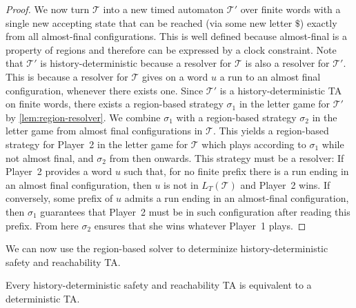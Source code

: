 \documentclass[10pt,a4paper]{amsart}
\theoremstyle{definition}
\numberwithin{equation}{section}
\newcommand{\T}{\mathcal{T}}
\newcommand{\strat}{\sigma}
\newcommand{\lang}{L_T}  %
\begin{document}
\begin{proof}
We now turn $\T$ into a new timed automaton $\T'$ over finite words
with a single new accepting state that can be reached (via some new letter $\$$)
exactly from all almost-final configurations.
This is well defined because almost-final is a property of regions and therefore can be expressed by a clock constraint.
Note that $\T'$ is history-deterministic because a resolver for $\T$ is also a resolver for $\T'$. This is because a resolver for $\T$ gives on a word $u$ a run to an almost final configuration, whenever there exists one.
Since $\T'$ is a history-deterministic TA on finite words, there exists a region-based strategy $\strat_1$ in the letter game for $\T'$  by \cref{lem:region-resolver}. 
We combine $\sigma_1$ with a region-based strategy $\strat_2$ in the letter game from almost final configurations in $\T$.
This yields a region-based strategy for Player~2 in the letter game for $\T$ which plays according to $\strat_1$
while not almost final, and $\sigma_2$ from then onwards.
This strategy must be a resolver:
If Player~2 provides a word $u$ such that, for no finite prefix there is a run ending in an almost final configuration,
then $u$ is not in $\lang(\T)$ and Player~2 wins.
If conversely, some prefix of $u$ admits a run ending in an almost-final configuration,
then $\sigma_1$ guarantees that Player~2 must be in such configuration after reading this prefix.
From here $\strat_2$ ensures that she wins whatever Player~1 plays.
\end{proof}


We can now use the region-based solver to determinize history-deterministic safety and reachability TA.

\begin{theorem}
\label{thm:safety-determinisable}
Every history-deterministic safety and reachability TA is equivalent to a deterministic TA.
\end{theorem}
\end{document}
